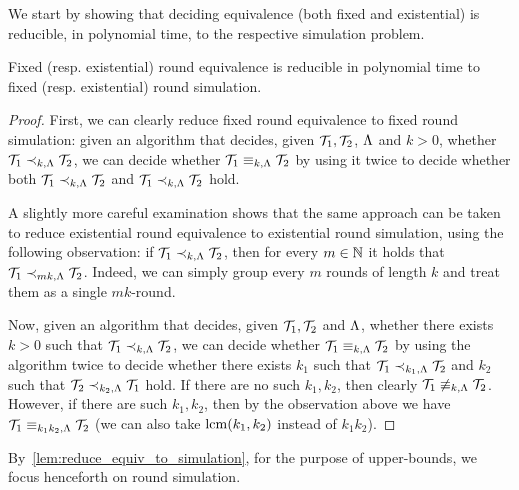We start by showing that deciding equivalence (both fixed and existential) is reducible, in polynomial time, to the respective simulation problem.
\begin{lemma}
	\label{lem:reduce_equiv_to_simulation}
    Fixed (resp. existential) round equivalence is reducible in polynomial time to fixed (resp. existential) round simulation.
\end{lemma}
\begin{proof}
First, we can clearly reduce fixed round equivalence to fixed round simulation: given an algorithm that decides, given $\mathcal{T}_1,\mathcal{T}_2$, $\Lambda$ and $k>0$, whether $\mathcal{T}_1\prec_{k,\Lambda} \mathcal{T}_2$, we can decide whether $\mathcal{T}_1\equiv_{k,\Lambda} \mathcal{T}_2$ by using it twice to decide whether both $\mathcal{T}_1\prec_{k,\Lambda} \mathcal{T}_2$ and $\mathcal{T}_1\prec_{k,\Lambda} \mathcal{T}_2$ hold. 

A slightly more careful examination shows that the same approach can be taken to reduce existential round equivalence to existential round simulation, using the following observation: if $\mathcal{T}_1\prec_{k,\Lambda} \mathcal{T}_2$, then for every $m\in \mathbb{N}$ it holds that $\mathcal{T}_1\prec_{mk,\Lambda}\mathcal{T}_2$. Indeed, we can simply group every $m$ rounds of length $k$ and treat them as a single $mk$-round.

Now, given an algorithm that decides, given $\mathcal{T}_1,\mathcal{T}_2$ and $\Lambda$, whether there exists $k>0$ such that $\mathcal{T}_1\prec_{k,\Lambda} \mathcal{T}_2$, we can decide whether $\mathcal{T}_1\equiv_{k,\Lambda} \mathcal{T}_2$ by using the algorithm twice to decide whether there exists $k_1$ such that $\mathcal{T}_1\prec_{k_1,\Lambda} \mathcal{T}_2$ and $k_2$ such that $\mathcal{T}_2\prec_{k_2,\Lambda} \mathcal{T}_1$ hold. If there are no such $k_1,k_2$, then clearly $\mathcal{T}_1 \not\equiv_{k,\Lambda} \mathcal{T}_2$. However, if there are such $k_1,k_2$, then by the observation above we have $\mathcal{T}_1\equiv_{k_1k_2,\Lambda}\mathcal{T}_2$ (we can also take ${\rm lcm}(k_1,k_2)$ instead of $k_1k_2$).
\end{proof}
 
By~\cref{lem:reduce_equiv_to_simulation}, for the purpose of upper-bounds, we focus henceforth on round simulation.
